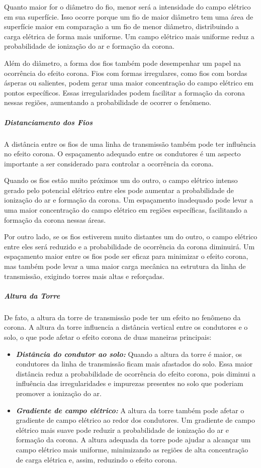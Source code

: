 \documentclass[a4paper, 12pt, onecolumn,singlespacing]{article}
\begin{document}
		Quanto maior for o diâmetro do fio, menor será a intensidade do campo elétrico em sua superfície. Isso ocorre porque um fio de maior diâmetro tem uma área de superfície maior em comparação a um fio de menor diâmetro, distribuindo a carga elétrica de forma mais uniforme. Um campo elétrico mais uniforme reduz a probabilidade de ionização do ar e formação da corona.
		
		Além do diâmetro, a forma dos fios também pode desempenhar um papel na ocorrência do efeito corona. Fios com formas irregulares, como fios com bordas ásperas ou salientes, podem gerar uma maior concentração do campo elétrico em pontos específicos. Essas irregularidades podem facilitar a formação da corona nessas regiões, aumentando a probabilidade de ocorrer o fenômeno.
		
		\subparagraph{Distanciamento dos Fios} A distância entre os fios de uma linha de transmissão também pode ter influência no efeito corona. O espaçamento adequado entre os condutores é um aspecto importante a ser considerado para controlar a ocorrência da corona.
		
		Quando os fios estão muito próximos um do outro, o campo elétrico intenso gerado pelo potencial elétrico entre eles pode aumentar a probabilidade de ionização do ar e formação da corona. Um espaçamento inadequado pode levar a uma maior concentração do campo elétrico em regiões específicas, facilitando a formação da corona nessas áreas.
		
		Por outro lado, se os fios estiverem muito distantes um do outro, o campo elétrico entre eles será reduzido e a probabilidade de ocorrência da corona diminuirá. Um espaçamento maior entre os fios pode ser eficaz para minimizar o efeito corona, mas também pode levar a uma maior carga mecânica na estrutura da linha de transmissão, exigindo torres mais altas e reforçadas.
		
		\subparagraph{Altura da Torre} De fato, a altura da torre de transmissão pode ter um efeito no fenômeno da corona. A altura da torre influencia a distância vertical entre os condutores e o solo, o que pode afetar o efeito corona de duas maneiras principais:
		\begin{itemize}
			\item \textbf{\textit{Distância do condutor ao solo:}} Quando a altura da torre é maior, os condutores da linha de transmissão ficam mais afastados do solo. Essa maior distância reduz a probabilidade de ocorrência do efeito corona, pois diminui a influência das irregularidades e impurezas presentes no solo que poderiam promover a ionização do ar.
			
			\item \textbf{\textit{Gradiente de campo elétrico:}} A altura da torre também pode afetar o gradiente de campo elétrico ao redor dos condutores. Um gradiente de campo elétrico mais suave pode reduzir a probabilidade de ionização do ar e formação da corona. A altura adequada da torre pode ajudar a alcançar um campo elétrico mais uniforme, minimizando as regiões de alta concentração de carga elétrica e, assim, reduzindo o efeito corona.
			
		\end{itemize}
		
\end{document}
